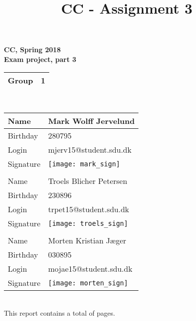 \documentclass[a4paper,10pt,titlepage]{report}
\date{}
\title{CC - Assignment 3}
\begin{document}
\newpage
{%
\centering
    \huge
    \bfseries
    \vspace{5mm}
CC, Spring 2018\\
Exam project, part 3\\
\vspace{5mm}
\begin{tabular}{|l|l|}
\hline
Group & 1 \\ \hline
\end{tabular}
\\
\vspace{10mm}
\begin{tabular}{@{}ll@{}}
\toprule
\multicolumn{1}{|l|}{Name}      & \multicolumn{1}{l|}{Mark Wolff Jervelund } \\ \midrule
\multicolumn{1}{|l|}{Birthday}  & \multicolumn{1}{l|}{280795} \\ \midrule
\multicolumn{1}{|l|}{Login}     & \multicolumn{1}{l|}{mjerv15@student.sdu.dk} \\ \midrule
\multicolumn{1}{|l|}{Signature} & \multicolumn{1}{l|}{\texttt{[image: mark\_sign]}} \\ \midrule
                                &                       \\ \midrule
\multicolumn{1}{|l|}{Name}      &  \multicolumn{1}{l|}{Troels Blicher Petersen} \\ \midrule
\multicolumn{1}{|l|}{Birthday}      &   \multicolumn{1}{l|}{230896} \\ \midrule
\multicolumn{1}{|l|}{Login}      &  \multicolumn{1}{l|}{trpet15@student.sdu.dk} \\ \midrule
\multicolumn{1}{|l|}{Signature}      & \multicolumn{1}{l|}{\texttt{[image: troels\_sign]} } \\ \midrule
                                &                       \\ \midrule
\multicolumn{1}{|l|}{Name}     &  \multicolumn{1}{l|}{Morten Kristian Jæger} \\ \midrule
\multicolumn{1}{|l|}{Birthday}      &  \multicolumn{1}{l|}{030895} \\ \midrule
\multicolumn{1}{|l|}{Login}     &   \multicolumn{1}{l|}{mojae15@student.sdu.dk} \\ \midrule
\multicolumn{1}{|l|}{Signature}    &  \multicolumn{1}{l|}{\texttt{[image: morten\_sign]}} \\ \midrule
\end{tabular}
\\
\vspace{10mm}
This report contains a total of \underline{ \pageref{LastPage} } pages.
}
\end{document}
